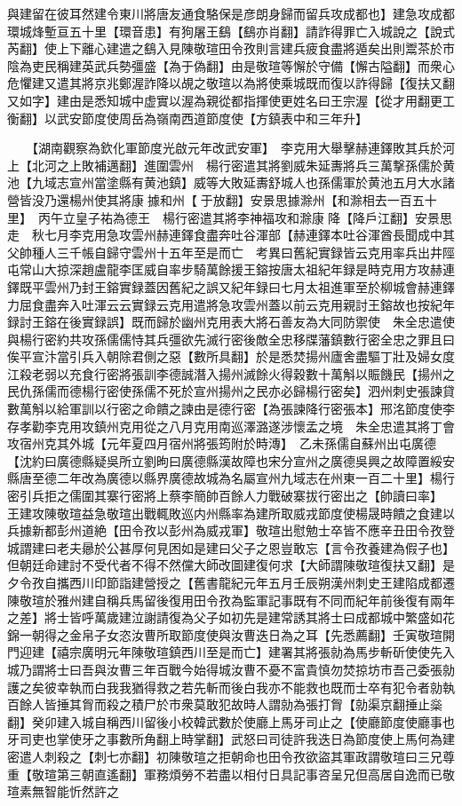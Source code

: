 與建留在彼耳然建令東川將唐友通食駱保是彦朗身歸而留兵攻成都也】建急攻成都環城烽塹亘五十里【環音患】有狗屠王鷂【鷂亦肖翻】請詐得罪亡入城說之【說式芮翻】使上下離心建遣之鷂入見陳敬瑄田令孜則言建兵疲食盡將遁矣出則鬻茶於市陰為吏民稱建英武兵勢彊盛【為于偽翻】由是敬瑄等懈於守備【懈古隘翻】而衆心危懼建又遣其將京兆鄭渥詐降以覘之敬瑄以為將使乘城既而復以詐得歸【復扶又翻又如字】建由是悉知城中虚實以渥為親從都指揮使更姓名曰王宗渥【從才用翻更工衡翻】以武安節度使周岳為嶺南西道節度使【方鎮表中和三年升】

　　【湖南觀察為欽化軍節度光啟元年改武安軍】　李克用大舉擊赫連鐸敗其兵於河上【北河之上敗補邁翻】進圍雲州　楊行密遣其將劉威朱延夀將兵三萬撃孫儒於黄池【九域志宣州當塗縣有黄池鎮】威等大敗延夀舒城人也孫儒軍於黄池五月大水諸營皆没乃還楊州使其將康據和州【于放翻】安景思據滁州【和滁相去一百五十里】　丙午立皇子祐為德王　楊行密遣其將李神福攻和滁康降【降戶江翻】安景思走　秋七月李克用急攻雲州赫連鐸食盡奔吐谷渾部【赫連鐸本吐谷渾酋長聞成中其父帥種人三千帳自歸守雲州十五年至是而亡　考異曰舊紀實録皆云克用率兵出井陘屯常山大掠深趙盧龍李匡威自率步騎萬餘援王鎔按唐太祖紀年録是時克用方攻赫連鐸既平雲州乃封王鎔實録蓋因舊紀之誤又紀年録曰七月太祖進軍至於柳城會赫連鐸力屈食盡奔入吐渾云云實録云克用遣將急攻雲州蓋以前云克用親討王鎔故也按紀年録討王鎔在後實録誤】既而歸於幽州克用表大將石善友為大同防禦使　朱全忠遣使與楊行密約共攻孫儒儒恃其兵彊欲先滅行密後敵全忠移牒藩鎮數行密全忠之罪且曰俟平宣汴當引兵入朝除君側之惡【數所具翻】於是悉焚揚州廬舍盡驅丁壯及婦女度江殺老弱以充食行密將張訓李德誠潛入揚州滅餘火得穀數十萬斛以賑饑民【揚州之民仇孫儒而德楊行密使孫儒不死於宣州揚州之民亦必歸楊行密矣】泗州刺史張諫貸數萬斛以給軍訓以行密之命饋之諫由是德行密【為張諫降行密張本】邢洺節度使李存孝勸李克用攻鎮州克用從之八月克用南巡澤潞遂涉懷孟之境　朱全忠遣其將丁會攻宿州克其外城【元年夏四月宿州將張筠附於時漙】　乙未孫儒自蘇州出屯廣德【沈約曰廣德縣疑吳所立劉昫曰廣德縣漢故障也宋分宣州之廣德吳興之故障置綏安縣唐至德二年改為廣德以縣界廣德故城為名屬宣州九域志在州東一百二十里】楊行密引兵拒之儒圍其寨行密將上蔡李簡帥百餘人力戰破寨拔行密出之【帥讀曰率】　王建攻陳敬瑄益急敬瑄出戰輒敗巡内州縣率為建所取威戎節度使楊晟時饋之食建以兵據新都彭州道絶【田令孜以彭州為威戎軍】敬瑄出慰勉士卒皆不應辛丑田令孜登城謂建曰老夫曏於公甚厚何見困如是建曰父子之恩豈敢忘【言令孜養建為假子也】但朝廷命建討不受代者不得不然儻大師改圖建復何求【大師謂陳敬瑄復扶又翻】是夕令孜自攜西川印節詣建營授之【舊書龍紀元年五月壬辰朔漢州刺史王建陷成都遷陳敬瑄於雅州建自稱兵馬留後復用田令孜為監軍記事既有不同而紀年前後復有兩年之差】將士皆呼萬歲建泣謝請復為父子如初先是建常誘其將士曰成都城中繁盛如花錦一朝得之金帛子女恣汝曹所取節度使與汝曹迭日為之耳【先悉薦翻】壬寅敬瑄開門迎建【禧宗廣明元年陳敬瑄鎮西川至是而亡】建署其將張勍為馬步斬斫使使先入城乃謂將士曰吾與汝曹三年百戰今始得城汝曹不憂不富貴慎勿焚掠坊市吾己委張勍護之矣彼幸執而白我我猶得救之若先斬而後白我亦不能救也既而士卒有犯令者勍執百餘人皆捶其胷而殺之積尸於市衆莫敢犯故時人謂勍為張打胷【勍渠京翻捶止橤翻】癸卯建入城自稱西川留後小校韓武數於使廳上馬牙司止之【使廳節度使廳事也牙司吏也掌使牙之事數所角翻上時掌翻】武怒曰司徒許我迭日為節度使上馬何為建密遣人刺殺之【刺七亦翻】初陳敬瑄之拒朝命也田令孜欲盜其軍政謂敬瑄曰三兄尊重【敬瑄第三朝直遙翻】軍務煩勞不若盡以相付日具記事咨呈兄但高居自逸而已敬瑄素無智能忻然許之